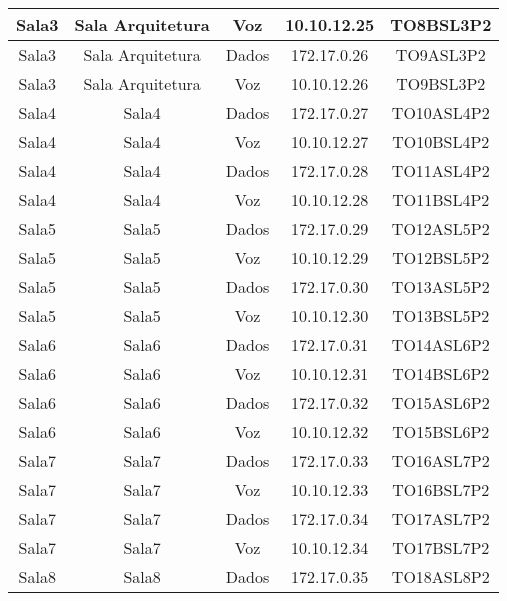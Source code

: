 \begin{table}[]
\begin{tabular}{ccccc}
		Sala3  & Sala Arquitetura   & Voz             & 10.10.12.25     & TO8BSL3P2            \\ \hline
		Sala3  & Sala Arquitetura   & Dados           & 172.17.0.26 	& TO9ASL3P2            \\ \hline
		Sala3  & Sala Arquitetura   & Voz             & 10.10.12.26     & TO9BSL3P2            \\ \hline
		Sala4  & Sala4              & Dados      	  & 172.17.0.27 	& TO10ASL4P2           \\ \hline
		Sala4  & Sala4              & Voz             & 10.10.12.27  	& TO10BSL4P2           \\ \hline
		Sala4  & Sala4              & Dados      	  & 172.17.0.28 	& TO11ASL4P2           \\ \hline
		Sala4  & Sala4              & Voz             & 10.10.12.28  	& TO11BSL4P2           \\ \hline
		Sala5  & Sala5              & Dados        	  & 172.17.0.29 	& TO12ASL5P2           \\ \hline
		Sala5  & Sala5              & Voz             & 10.10.12.29  	& TO12BSL5P2           \\ \hline
		Sala5  & Sala5              & Dados       	  & 172.17.0.30 	& TO13ASL5P2           \\ \hline
		Sala5  & Sala5              & Voz             & 10.10.12.30  	& TO13BSL5P2           \\ \hline
		Sala6  & Sala6              & Dados        	  & 172.17.0.31 	& TO14ASL6P2           \\ \hline
		Sala6  & Sala6              & Voz             & 10.10.12.31     & TO14BSL6P2           \\ \hline
		Sala6  & Sala6              & Dados       	  & 172.17.0.32 	& TO15ASL6P2           \\ \hline
		Sala6  & Sala6              & Voz             & 10.10.12.32     & TO15BSL6P2           \\ \hline
		Sala7  & Sala7              & Dados        	  & 172.17.0.33 	& TO16ASL7P2           \\ \hline
		Sala7  & Sala7              & Voz             & 10.10.12.33     & TO16BSL7P2           \\ \hline
		Sala7  & Sala7              & Dados       	  & 172.17.0.34 	& TO17ASL7P2           \\ \hline
		Sala7  & Sala7              & Voz             & 10.10.12.34     & TO17BSL7P2           \\ \hline
		Sala8  & Sala8              & Dados        	  & 172.17.0.35 	& TO18ASL8P2           \\ \hline

\end{tabular}
\end{table}
